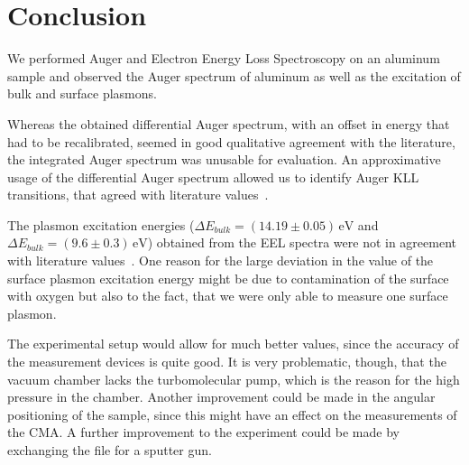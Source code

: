 \documentclass[a4paper,10pt]{scrartcl}
\begin{document}
\section{Conclusion}

We performed Auger and Electron Energy Loss Spectroscopy on an aluminum sample and observed the Auger spectrum of aluminum as well as the excitation of bulk and surface plasmons. 

Whereas the obtained differential Auger spectrum, with an offset in energy that had to be recalibrated, seemed in good qualitative agreement with the literature, the integrated Auger spectrum was unusable for evaluation. An approximative usage of the differential Auger spectrum allowed us to identify Auger KLL transitions, that agreed with literature values~\cite{augerpaper}.

The plasmon excitation energies ($\Delta E_{bulk} = (14.19 \pm 0.05)\,\mbox{eV}$ and $\Delta E_{bulk} = (9.6 \pm 0.3)\,\mbox{eV}$) obtained from the EEL spectra were not in agreement with literature values~\cite{plasmonpaper}. One reason for the large deviation in the value of the surface plasmon excitation energy might be due to contamination of the surface with oxygen but also to the fact, that we were only able to measure one surface plasmon.

The experimental setup would allow for much better values, since the accuracy of the measurement devices is quite good. It is very problematic, though, that the vacuum chamber lacks the turbomolecular pump, which is the reason for the high pressure in the chamber. Another improvement could be made in the angular positioning of the sample, since this might have an effect on the measurements of the CMA. A further improvement to the experiment could be made by exchanging the file for a sputter gun.

\nocite{skript}
\nocite{augerpaper}
\nocite{plasmonpaper}
\nocite{handbook}
\nocite{ben}
\nocite{christian}



\end{document}
